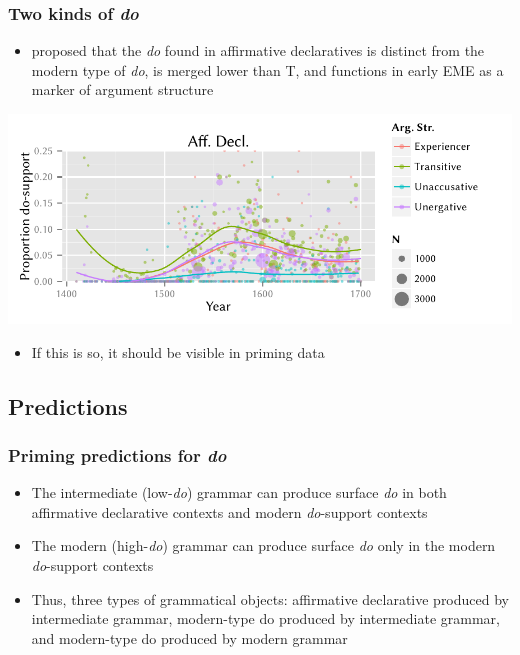\documentclass{digs-slides}
\begin{document}
\begin{frame}
    \frametitle{Two kinds of \emph{do}}
    \begin{itemize}
      \item \textcite{Ecay2012a} proposed that the \emph{do} found in
        affirmative declaratives is distinct from the modern type of
        \emph{do}, is merged lower than T, and functions in early EME as
        a marker of argument structure
    \end{itemize}
    \includegraphics[width=\textwidth]{static-figures/do-aff}
    \begin{itemize}
      \item If this is so, it should be visible in priming data
    \end{itemize}
\end{frame}

\subsection{Predictions}
\label{sec:predictions}

\begin{frame}
    \frametitle{Priming predictions for \emph{do}}
    \begin{itemize}
      \item The intermediate (low-\emph{do}) grammar can produce surface
        \emph{do} in both affirmative declarative contexts and modern
        \emph{do}-support contexts
      \item The modern (high-\emph{do}) grammar can produce surface
        \emph{do} only in the modern \emph{do}-support contexts
      \item Thus, three types of grammatical objects: affirmative
        declarative produced by intermediate grammar, modern-type do
        produced by intermediate grammar, and modern-type do produced by
        modern grammar
    \end{itemize}
\end{frame}
\end{document}
